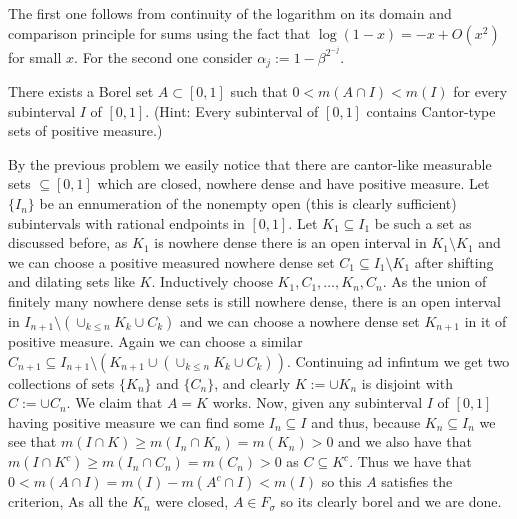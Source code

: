 \documentclass[12pt,a4paper]{article}
\begin{document}
\begin{solution}
    The first one follows from continuity of the logarithm on its domain and comparison principle for sums using the fact that $\log(1-x)=-x+O(x^2)$ for small $x$. For the second one consider $\alpha_j:=1-\beta^{2^{-j}}$.
\end{solution}
\begin{problem}\label{prob:1-33}
There exists a Borel set $A \subset [0, 1]$ such that $0 < m(A \cap I) < m(I)$ for every subinterval $I$ of $[0, 1]$. (Hint: Every subinterval of $[0, 1]$ contains Cantor-type sets of positive measure.)
\end{problem}
\begin{solution}
    By the previous problem we easily notice that there are cantor-like measurable sets $\subseteq[0,1]$ which are closed, nowhere dense and have positive measure. 
    Let $\{I_n\}$ be an ennumeration of the nonempty open (this is clearly sufficient) subintervals with rational endpoints in $[0,1]$. 
    Let $K_1\subseteq I_1$ be such a set as discussed before, as $K_1$ is nowhere dense there is an open interval in $K_1\setminus K_1$ and we can choose a positive measured nowhere dense set $C_1\subseteq I_1\setminus K_1$ after shifting and dilating sets like $K$.
    Inductively choose $K_1,C_1,\ldots,K_n,C_n$. 
    As the union of finitely many nowhere dense sets is still nowhere dense, there is an open interval in $I_{n+1}\setminus(\cup_{k\leq n}K_k\cup C_k)$ and we can choose a nowhere dense set $K_{n+1}$ in it of positive measure.
    Again we can choose a similar $C_{n+1}\subseteq I_{n+1}\setminus(K_{n+1}\cup(\cup_{k\leq n}K_k\cup C_k))$.
    Continuing ad infintum we get two collections of sets $\{K_n\}$ and $\{C_n\}$, and clearly $K:=\cup K_n$ is disjoint with $C:=\cup C_n.$
    We claim that $A=K$ works. 
    Now, given any subinterval $I$ of $[0,1]$ having positive measure we can find some $I_n\subseteq I$ and thus, because $K_n\subseteq I_n$ we see that $m(I\cap K)\geq m(I_n\cap K_n)=m(K_n)>0$ and we also have that $m(I\cap K^c)\geq m(I_n\cap C_n)=m(C_n)>0$ as $C\subseteq K^c$.
    Thus we have that $0<m(A\cap I)=m(I)-m(A^c\cap I)<m(I)$ so this $A$ satisfies the criterion,
    As all the $K_n$ were closed, $A\in F_\sigma$ so its clearly borel and we are done.
\end{solution}
\end{document}
